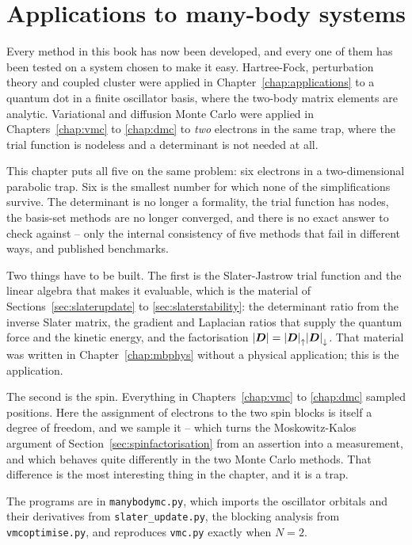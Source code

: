 \chapter{Applications to many-body systems}
\label{chap:appmb}

Every method in this book has now been developed, and every one of them has
been tested on a system chosen to make it easy.  Hartree-Fock, perturbation
theory and coupled cluster were applied in Chapter~\ref{chap:applications} to a
quantum dot in a finite oscillator basis, where the two-body matrix elements
are analytic.  Variational and diffusion Monte Carlo were applied in
Chapters~\ref{chap:vmc} to \ref{chap:dmc} to \emph{two} electrons in the same
trap, where the trial function is nodeless and a determinant is not needed at
all.

This chapter puts all five on the same problem: six electrons in a
two-dimensional parabolic trap.  Six is the smallest number for which none of
the simplifications survive.  The determinant is no longer a formality, the
trial function has nodes, the basis-set methods are no longer converged, and
there is no exact answer to check against -- only the internal consistency of
five methods that fail in different ways, and published benchmarks.

Two things have to be built.  The first is the Slater-Jastrow trial function
and the linear algebra that makes it evaluable, which is the material of
Sections~\ref{sec:slaterupdate} to \ref{sec:slaterstability}: the determinant
ratio from the inverse Slater matrix, the gradient and Laplacian ratios that
supply the quantum force and the kinetic energy, and the factorisation
${|\boldsymbol{D}|}={|\boldsymbol{D}|}_\uparrow{|\boldsymbol{D}|}_\downarrow$.  That material was written in
Chapter~\ref{chap:mbphys} without a physical application; this is the
application.

The second is the spin.  Everything in Chapters~\ref{chap:vmc} to
\ref{chap:dmc} sampled positions.  Here the assignment of electrons to the two
spin blocks is itself a degree of freedom, and we sample it -- which turns the
Moskowitz-Kalos argument of Section~\ref{sec:spinfactorisation} from an
assertion into a measurement, and which behaves quite differently in the two
Monte Carlo methods.  That difference is the most interesting thing in the
chapter, and it is a trap.

The programs are in \texttt{manybodymc.py}, which imports the oscillator
orbitals and their derivatives from \texttt{slater\_update.py}, the blocking
analysis from \texttt{vmcoptimise.py}, and reproduces \texttt{vmc.py} exactly
when $N=2$.

